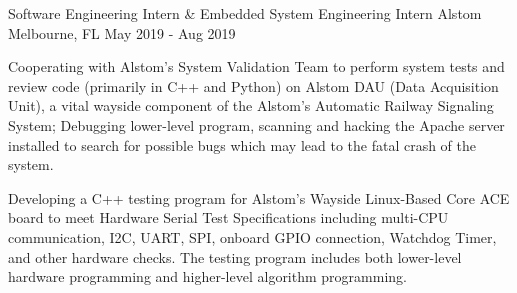 \begin{cventries}
  \cventry
    {Software Engineering Intern \& Embedded System Engineering Intern} %
    {Alstom} %
    {Melbourne, FL} %
    {May 2019 - Aug 2019} %
    {
      \begin{cvitems} %
        \item {Cooperating with Alstom's System Validation Team to perform system tests and review code (primarily in C++ and Python) on Alstom DAU (Data Acquisition Unit), a vital wayside component of the Alstom's Automatic Railway Signaling System; Debugging lower-level program, scanning and hacking the Apache server installed to search for possible bugs which may lead to the fatal crash of the system.}
        \item {Developing a C++ testing program for Alstom's Wayside Linux-Based Core ACE board to meet Hardware Serial Test Specifications including multi-CPU communication, I2C, UART, SPI, onboard GPIO connection, Watchdog Timer, and other hardware checks. The testing program includes both lower-level hardware programming and higher-level algorithm programming.}
      \end{cvitems}
    }

\end{cventries}
